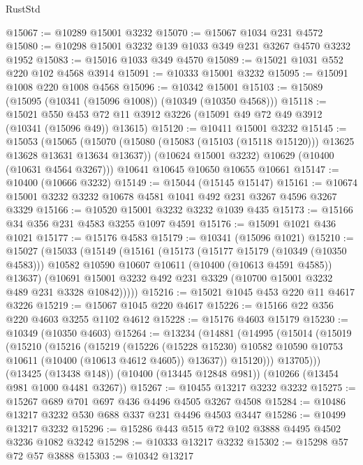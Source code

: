 \begin{lexlean}{RustStd}
\begin{coremodule}
{\begin{coremodule}
{{{{{{{{{{{{{{{{{{{{{{{{{@15067 := @10289 @15001 @3232
@15070 := @15067 @1034 @231 @4572
@15080 := @10298 @15001 @3232 @139 @1033 @349 @231 @3267 @4570 @3232 @1952
@15083 := @15016 @1033 @349 @4570
@15089 := @15021 @1031 @552 @220 @102 @4568 @3914
@15091 := @10333 @15001 @3232
@15095 := @15091 @1008 @220 @1008 @4568
@15096 := @10342 @15001
@15103 := @15089 (@15095 (@10341 (@15096 @1008)) (@10349 (@10350 @4568)))
@15118 := @15021
    @550
    @453
    @72
    @11
    @3912
    @3226
    (@15091 @49 @72 @49 @3912 (@10341 (@15096 @49)) @13615)
@15120 := @10411 @15001 @3232
@15145 := @15053
    (@15065
      (@15070 (@15080 (@15083 (@15103 (@15118 @15120))) @13625 @13628 @13631 @13634 @13637))
      (@10624 @15001 @3232)
      @10629
      (@10400 (@10631 @4564 @3267)))
    @10641
    @10645
    @10650
    @10655
    @10661
@15147 := @10400 (@10666 @3232)
@15149 := @15044 (@15145 @15147)
@15161 := @10674 @15001 @3232 @3232 @10678 @4581 @1041 @492 @231 @3267 @4596 @3267 @3329
@15166 := @10520 @15001 @3232 @3232 @1039 @435
@15173 := @15166 @34 @356 @231 @4583 @3255 @1097 @4591
@15176 := @15091 @1021 @436 @1021
@15177 := @15176 @4583
@15179 := @10341 (@15096 @1021)
@15210 := @15027
    (@15033
      (@15149
        (@15161
          (@15173
            (@15177 @15179 (@10349 (@10350 @4583)))
            @10582
            @10590
            @10607
            @10611
            (@10400 (@10613 @4591 @4585))
            @13637)
          (@10691 @15001 @3232 @492 @231 @3329 (@10700 @15001 @3232 @489 @231 @3328 @10842)))))
@15216 := @15021 @1045 @453 @220 @11 @4617 @3226
@15219 := @15067 @1045 @220 @4617
@15226 := @15166 @22 @356 @220 @4603 @3255 @1102 @4612
@15228 := @15176 @4603 @15179
@15230 := @10349 (@10350 @4603)
@15264 := @13234
    (@14881
      (@14995
        (@15014
          (@15019
            (@15210
              (@15216
                (@15219
                  (@15226
                    (@15228 @15230)
                    @10582
                    @10590
                    @10753
                    @10611
                    (@10400 (@10613 @4612 @4605))
                    @13637))
                @15120)))
          @13705)))
    (@13425 (@13438 @148))
    (@10400 (@13445 @12848 @981))
    (@10266 (@13454 @981 @1000 @4481 @3267))
@15267 := @10455 @13217 @3232 @3232
@15275 := @15267 @689 @701 @697 @436 @4496 @4505 @3267 @4508
@15284 := @10486 @13217 @3232 @530 @688 @337 @231 @4496 @4503 @3447
@15286 := @10499 @13217 @3232
@15296 := @15286 @443 @515 @72 @102 @3888 @4495 @4502 @3236 @1082 @3242
@15298 := @10333 @13217 @3232
@15302 := @15298 @57 @72 @57 @3888
@15303 := @10342 @13217
}}}}}}}}}}}}}}}}}}}}}}}}}
\end{coremodule}}
\end{coremodule}
\end{lexlean}

